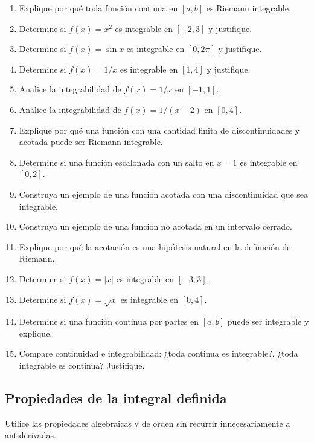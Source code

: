 \documentclass[12pt]{article}
\begin{document}
\begin{enumerate}[resume]
\item Explique por qué toda función continua en $[a,b]$ es Riemann integrable.
\item Determine si $f(x)=x^2$ es integrable en $[-2,3]$ y justifique.
\item Determine si $f(x)=\sin x$ es integrable en $[0,2\pi]$ y justifique.
\item Determine si $f(x)=1/x$ es integrable en $[1,4]$ y justifique.
\item Analice la integrabilidad de $f(x)=1/x$ en $[-1,1]$.
\item Analice la integrabilidad de $f(x)=1/(x-2)$ en $[0,4]$.
\item Explique por qué una función con una cantidad finita de discontinuidades y acotada puede ser Riemann integrable.
\item Determine si una función escalonada con un salto en $x=1$ es integrable en $[0,2]$.
\item Construya un ejemplo de una función acotada con una discontinuidad que sea integrable.
\item Construya un ejemplo de una función no acotada en un intervalo cerrado.
\item Explique por qué la acotación es una hipótesis natural en la definición de Riemann.
\item Determine si $f(x)=|x|$ es integrable en $[-3,3]$.
\item Determine si $f(x)=\sqrt{x}$ es integrable en $[0,4]$.
\item Determine si una función continua por partes en $[a,b]$ puede ser integrable y explique.
\item Compare continuidad e integrabilidad: ¿toda continua es integrable?, ¿toda integrable es continua? Justifique.
\end{enumerate}
\subsection{Propiedades de la integral definida}
Utilice las propiedades algebraicas y de orden sin recurrir innecesariamente a antiderivadas.
\end{document}
